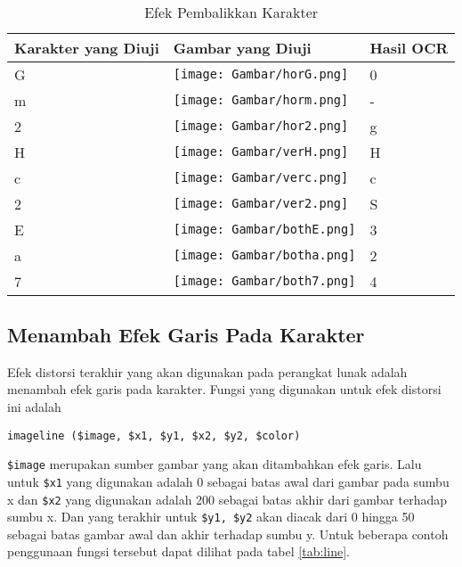 \begin{center}
\begin{table}
\caption[Tabel 3-2 Efek Pembalikkan Karakter]{Efek Pembalikkan Karakter}\\
\label{tab:flip}
\begin{center}
\begin{tabular}{|l|l|l|}
\hline
Karakter yang Diuji & Gambar yang Diuji & Hasil OCR\\
\hline
G & \texttt{[image: Gambar/horG.png]} & 0\\
\hline
m & \texttt{[image: Gambar/horm.png]} & -\\
\hline
2 & \texttt{[image: Gambar/hor2.png]} & g\\
\hline
H & \texttt{[image: Gambar/verH.png]} & H\\
\hline
c & \texttt{[image: Gambar/verc.png]} & c\\
\hline
2 & \texttt{[image: Gambar/ver2.png]} & S\\
\hline
E & \texttt{[image: Gambar/bothE.png]} & 3\\
\hline
a & \texttt{[image: Gambar/botha.png]} & 2\\
\hline
7 & \texttt{[image: Gambar/both7.png]} & 4\\
\hline
\end{tabular}
\end{center}
\end{table}
\end{center}

\subsection{Menambah Efek Garis Pada Karakter}
Efek distorsi terakhir yang akan digunakan pada perangkat lunak adalah menambah efek garis pada karakter. Fungsi yang digunakan untuk efek distorsi ini adalah
\begin{verbatim}
imageline ($image, $x1, $y1, $x2, $y2, $color)
\end{verbatim}
\verb"$image" merupakan sumber gambar yang akan ditambahkan efek garis. Lalu untuk \verb"$x1" yang digunakan adalah 0 sebagai batas awal dari gambar pada sumbu x dan \verb"$x2" yang digunakan adalah 200 sebagai batas akhir dari gambar terhadap sumbu x. Dan yang terakhir untuk \verb"$y1, $y2" akan diacak dari 0 hingga 50 sebagai batas gambar awal dan akhir terhadap sumbu y. Untuk beberapa contoh penggunaan fungsi tersebut dapat dilihat pada tabel \ref{tab:line}.

